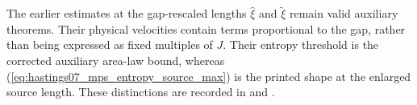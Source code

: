 \documentclass{article}
\begin{document}
The earlier estimates at the gap-rescaled lengths $\hat\xi$ and
$\tilde\xi$ remain valid auxiliary theorems. Their physical velocities
contain terms proportional to the gap, rather than being expressed as
fixed multiples of $J$. Their entropy threshold is the corrected auxiliary area-law bound,
whereas (\ref{eq:hastings07_mps_entropy_source_max}) is the printed shape
at the enlarged source length. These distinctions are recorded in
 and
.



\end{document}
